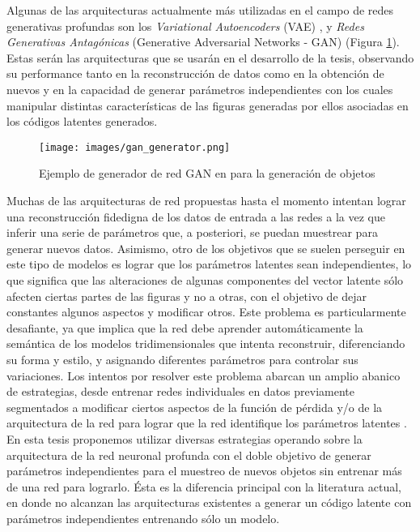 \documentclass[spanish]{article}
\begin{document}
Algunas de las arquitecturas actualmente más utilizadas en el campo de redes generativas profundas son los
\textit{Variational Autoencoders} (VAE) \cite{Kingma2013}, y \textit{Redes Generativas Antagónicas}
(Generative Adversarial Networks - GAN) \cite{Goodfellow2014} (Figura \ref{GAN}). Estas serán las arquitecturas
que se usarán en el desarrollo de la tesis, observando su performance tanto en la reconstrucción de datos como en
la obtención de nuevos y en la capacidad de generar parámetros independientes con los cuales manipular distintas
características de las figuras generadas por ellos asociadas en los códigos latentes generados.

\begin{figure}[h]
\texttt{[image: images/gan\_generator.png]}
\centering
\caption{Ejemplo de generador de red GAN en \cite{Wu2016} para la generación de objetos}
\label{GAN}
\end{figure}

Muchas de las arquitecturas de red propuestas hasta el momento
\cite{Gao2019, Park2019, Olszewski2019, Li2019, Muralikrishnan2019, Yin2019} intentan lograr una reconstrucción
fidedigna de los datos de entrada a las redes a la vez que inferir una serie de parámetros que, a posteriori, se
puedan muestrear para generar nuevos datos. Asimismo, otro de los objetivos que se suelen perseguir en este tipo
de modelos es lograr que los parámetros latentes sean independientes, lo que significa que las alteraciones de
algunas componentes del vector latente sólo afecten ciertas partes de las figuras y no a otras, con el objetivo
de dejar constantes algunos aspectos y modificar otros. Este problema es particularmente desafiante, ya que
implica que la red debe aprender automáticamente la semántica de los modelos tridimensionales que intenta
reconstruir, diferenciando su forma y estilo, y asignando diferentes parámetros para controlar sus variaciones.
Los intentos por resolver este problema abarcan un amplio abanico de estrategias, desde entrenar redes
individuales en datos previamente segmentados \cite{Li2019} a modificar ciertos aspectos de la función de pérdida
y/o de la arquitectura de la red para lograr que la red identifique los parámetros latentes
\cite{Yin2019, Higgins2017}. En esta tesis proponemos utilizar diversas estrategias operando sobre la
arquitectura de la red neuronal profunda con el doble objetivo de generar parámetros independientes para el
muestreo de nuevos objetos sin entrenar más de una red para lograrlo. Ésta es la diferencia principal con la
literatura actual, en donde no alcanzan las arquitecturas existentes a generar un código latente con parámetros
independientes entrenando sólo un modelo.
\end{document}
